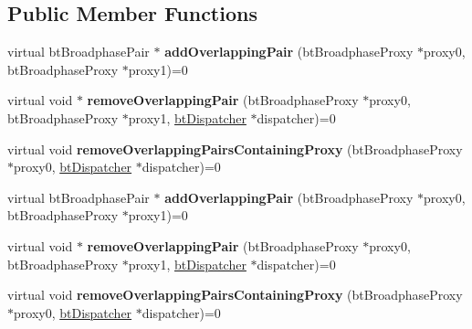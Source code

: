 \subsection*{Public Member Functions}
\begin{DoxyCompactItemize}
\item 
\mbox{\label{classbtOverlappingPairCallback_af9812526d52b41a8d91c5dc9d73f39f1}} 
virtual bt\+Broadphase\+Pair $\ast$ {\bfseries add\+Overlapping\+Pair} (bt\+Broadphase\+Proxy $\ast$proxy0, bt\+Broadphase\+Proxy $\ast$proxy1)=0
\item 
\mbox{\label{classbtOverlappingPairCallback_aca7cc587fa69c4471af85afe8dc0aef9}} 
virtual void $\ast$ {\bfseries remove\+Overlapping\+Pair} (bt\+Broadphase\+Proxy $\ast$proxy0, bt\+Broadphase\+Proxy $\ast$proxy1, \hyperlink{classbtDispatcher}{bt\+Dispatcher} $\ast$dispatcher)=0
\item 
\mbox{\label{classbtOverlappingPairCallback_ac6bd83bc84c9db75b194096b4f4abb82}} 
virtual void {\bfseries remove\+Overlapping\+Pairs\+Containing\+Proxy} (bt\+Broadphase\+Proxy $\ast$proxy0, \hyperlink{classbtDispatcher}{bt\+Dispatcher} $\ast$dispatcher)=0
\item 
\mbox{\label{classbtOverlappingPairCallback_af9812526d52b41a8d91c5dc9d73f39f1}} 
virtual bt\+Broadphase\+Pair $\ast$ {\bfseries add\+Overlapping\+Pair} (bt\+Broadphase\+Proxy $\ast$proxy0, bt\+Broadphase\+Proxy $\ast$proxy1)=0
\item 
\mbox{\label{classbtOverlappingPairCallback_aca7cc587fa69c4471af85afe8dc0aef9}} 
virtual void $\ast$ {\bfseries remove\+Overlapping\+Pair} (bt\+Broadphase\+Proxy $\ast$proxy0, bt\+Broadphase\+Proxy $\ast$proxy1, \hyperlink{classbtDispatcher}{bt\+Dispatcher} $\ast$dispatcher)=0
\item 
\mbox{\label{classbtOverlappingPairCallback_ac6bd83bc84c9db75b194096b4f4abb82}} 
virtual void {\bfseries remove\+Overlapping\+Pairs\+Containing\+Proxy} (bt\+Broadphase\+Proxy $\ast$proxy0, \hyperlink{classbtDispatcher}{bt\+Dispatcher} $\ast$dispatcher)=0
\end{DoxyCompactItemize}


